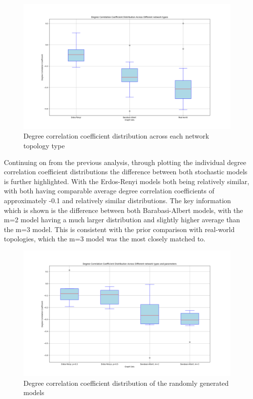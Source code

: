 \begin{figure}
    \centering
    \includegraphics[width=0.9\linewidth]{images/FINAL-TOPO-COMP/Degree-coeff-distrib/Distrib-by-type.png}
    \caption{Degree correlation coefficient distribution across each network topology type}
    \label{fig:enter-label}
\end{figure}

Continuing on from the previous analysis, through plotting the individual degree correlation coefficient distributions the difference between both stochastic models is further highlighted. With the Erdos-Renyi models both being relatively similar, with both having comparable average degree correlation coefficients of approximately -0.1 and relatively similar distributions. The key information which is shown is the difference between both Barabasi-Albert models, with the m=2 model having a much larger distribution and slightly higher average than the m=3 model. This is consistent with the prior comparison with real-world topologies, which the m=3 model was the most closely matched to. 
\begin{figure}
    \centering
    \includegraphics[width=0.9\linewidth]{images/FINAL-TOPO-COMP/Degree-coeff-distrib/Distrib-by-param.png}
    \caption{Degree correlation coefficient distribution of the randomly generated models}
    \label{fig:enter-label}
\end{figure}

